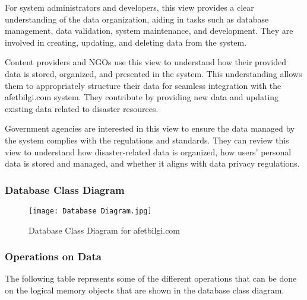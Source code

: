 \documentclass[12pt, letterpaper]{article}
\begin{document}
For system administrators and developers, this view provides a clear understanding of the data organization, aiding in tasks such as database management, data validation, system maintenance, and development. They are involved in creating, updating, and deleting data from the system.

Content providers and NGOs use this view to understand how their provided data is stored, organized, and presented in the system. This understanding allows them to appropriately structure their data for seamless integration with the afetbilgi.com system. They contribute by providing new data and updating existing data related to disaster resources.

Government agencies are interested in this view to ensure the data managed by the system complies with the regulations and standards. They can review this view to understand how disaster-related data is organized, how users' personal data is stored and managed, and whether it aligns with data privacy regulations.

\subsubsection{Database Class Diagram}

\begin{figure}[H]
\centering
\texttt{[image: Database Diagram.jpg]}
\caption{Database Class Diagram for afetbilgi.com}
\end{figure}

\subsubsection{Operations on Data}

The following table represents some of the different operations that can be done on the logical memory objects that are shown in the database class diagram.
\end{document}
